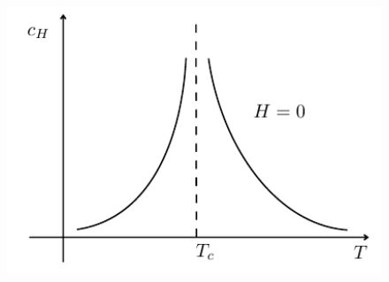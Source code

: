 \documentclass[../../Main/Main.tex]{subfiles}
\begin{document}
\begin{figure}[h!]
\begin{minipage}[c]{0.5\linewidth}
{\includegraphics[width=1\textwidth]{./img/12__2.pdf}
    \label{fig:3_4_3} }
\end{minipage}
\begin{minipage}[]{0.5\linewidth}
\centering
{}
\end{minipage}
\caption{\label{fig:}}
\end{figure}
\end{document}
